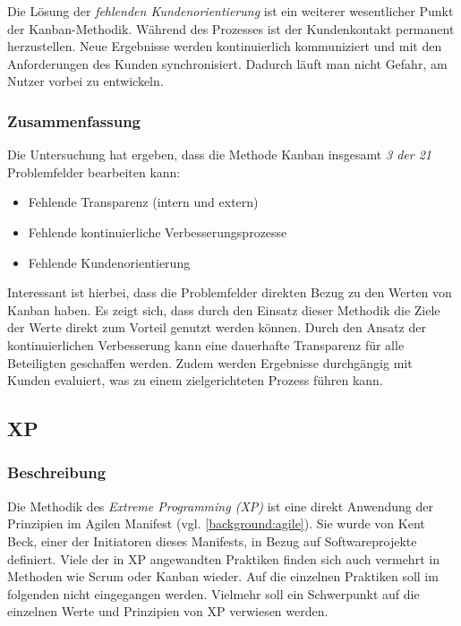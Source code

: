 Die Lösung der \textit{fehlenden Kundenorientierung} ist ein weiterer wesentlicher Punkt der Kanban-Methodik. Während des Prozesses ist der Kundenkontakt permanent herzustellen. Neue Ergebnisse werden kontinuierlich kommuniziert und mit den Anforderungen des Kunden synchronisiert. Dadurch läuft man nicht Gefahr, am Nutzer vorbei zu entwickeln.


\subsubsection{Zusammenfassung}

Die Untersuchung hat ergeben, dass die Methode Kanban insgesamt \textit{3 der 21} Problemfelder bearbeiten kann:

\begin{itemize}[noitemsep, topsep=0pt]
	\item Fehlende Transparenz (intern und extern)
	\item Fehlende kontinuierliche Verbesserungsprozesse
	\item Fehlende Kundenorientierung
\end{itemize}

Interessant ist hierbei, dass die Problemfelder direkten Bezug zu den Werten von Kanban haben. Es zeigt sich, dass durch den Einsatz dieser Methodik die Ziele der Werte direkt zum Vorteil genutzt werden können. Durch den Ansatz der kontinuierlichen Verbesserung kann eine dauerhafte Transparenz für alle Beteiligten geschaffen werden. Zudem werden Ergebnisse durchgängig mit Kunden evaluiert, was zu einem  zielgerichteten Prozess führen kann.  

\subsection{XP}

\subsubsection{Beschreibung}

Die Methodik des \textit{Extreme Programming (XP)} ist eine direkt Anwendung der Prinzipien im Agilen Manifest (vgl. \ref{background:agile}). Sie wurde von Kent Beck, einer der Initiatoren dieses Manifests, in Bezug auf Softwareprojekte definiert. \cite[S. 13]{hanser_agile_2010} Viele der in XP angewandten Praktiken finden sich auch vermehrt in Methoden wie Scrum oder Kanban wieder. Auf die einzelnen Praktiken soll im folgenden nicht eingegangen werden. Vielmehr soll ein Schwerpunkt auf die einzelnen Werte und Prinzipien von XP verwiesen werden.

